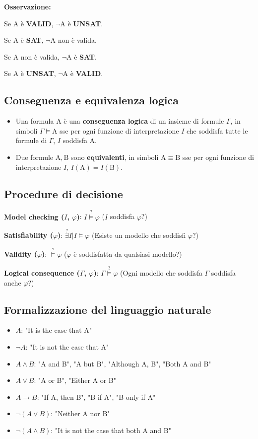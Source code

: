 \textbf{Osservazione:}

Se $\mathrm{A}$ è \textbf{VALID}, $\lnot \mathrm{A}$ è \textbf{UNSAT}.

Se $\mathrm{A}$ è \textbf{SAT}, $\lnot \mathrm{A}$ non è valida.

Se $\mathrm{A}$ non è valida, $\lnot \mathrm{A}$ è \textbf{SAT}.

Se $\mathrm{A}$ è \textbf{UNSAT}, $\lnot \mathrm{A}$ è \textbf{VALID}. 


\subsection{Conseguenza e equivalenza logica}
\begin{itemize}
\item Una formula $\mathrm{A}$ è una \textbf{conseguenza logica} di un insieme di formule $\Gamma$, in simboli $\Gamma \models \mathrm{A}$ sse per ogni funzione di interpretazione $I$ che soddisfa tutte le formule di $\Gamma$, $I$ soddisfa $\mathrm{A}$.

\item Due formule $\mathrm{A}, \mathrm{B}$ sono \textbf{equivalenti}, in simboli $\mathrm{A} \equiv \mathrm{B}$ sse per ogni funzione di interpretazione $I$, $I(\mathrm{A}) = I(\mathrm{B})$. 
\end{itemize}

\subsection{Procedure di decisione}

\textbf{Model checking ($I$, $\varphi$)}: $I \stackrel{?}{\models} \varphi$ ($I$ soddisfa $\varphi$?)

\textbf{Satisfiability ($\varphi$)}: $\stackrel{?}{\exists} I | I \models \varphi$ (Esiste un modello che soddisfi $\varphi$?)

\textbf{Validity ($\varphi$)}: $\stackrel{?}{\models} \varphi$ ($\varphi$ è soddisfatta da qualsiasi modello?)

\textbf{Logical consequence ($\Gamma$, $\varphi$)}: $\Gamma \stackrel{?}{\models} \varphi$ (Ogni modello che soddisfa $\Gamma$ soddisfa anche $\varphi$?)

\subsection{Formalizzazione del linguaggio naturale}

\begin{itemize}
\item $A$: "It is the case that A"
\item $\lnot A$: "It is not the case that A"
\item $A \land B$: "A and B", "A but B", "Although A, B", "Both A and B"
\item $A \lor B$: "A or B", "Either A or B"
\item $A \to B$: "If A, then B", "B if A", "B only if A"
\item $\lnot (A \lor B)$: "Neither A nor B"
\item $\lnot (A \land B)$: "It is not the case that both A and B"
\end{itemize}
